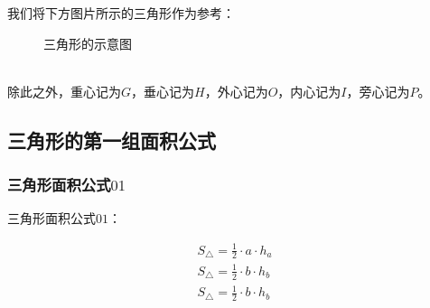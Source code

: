 \documentclass[UTF8]{ctexart}
\begin{document}
    我们将下方图片所示的三角形作为参考：
    \begin{figure}[h]
        \begin{center}
            \caption{三角形的示意图}
        \end{center}
    \end{figure}\\
    除此之外，重心记为$G$，垂心记为$H$，外心记为$O$，内心记为$I$，旁心记为$P$。

\newpage

\subsection{三角形的第一组面积公式}

\subsubsection{三角形面积公式$01$}
    三角形面积公式$01$：
    \begin{large}
        \begin{align*}
            S_{\triangle}=\frac{1}{2}\cdot a\cdot h_a\\[3mm]
            S_{\triangle}=\frac{1}{2}\cdot b\cdot h_b\\[3mm]
            S_{\triangle}=\frac{1}{2}\cdot b\cdot h_b
        \end{align*}
    \end{large}
\end{document}
